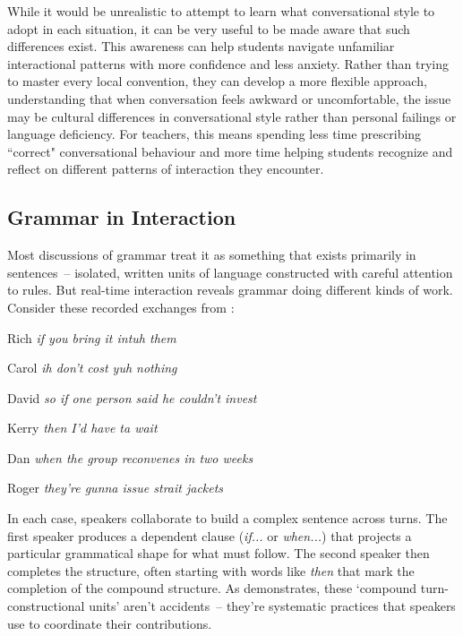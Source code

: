 While it would be unrealistic to attempt to learn what conversational style to adopt in each situation, it can be very useful to be made aware that such differences exist. This awareness can help students navigate unfamiliar interactional patterns with more confidence and less anxiety. Rather than trying to master every local convention, they can develop a more flexible approach, understanding that when conversation feels awkward or uncomfortable, the issue may be cultural differences in conversational style rather than personal failings or language deficiency. For teachers, this means spending less time prescribing ``correct" conversational behaviour and more time helping students recognize and reflect on different patterns of interaction they encounter.

\subsection{Grammar in Interaction} \label{subsec:grammar-interaction}

Most discussions of grammar treat it as something that exists primarily in sentences~-- isolated, written units of language constructed with careful attention to rules. But real-time interaction reveals grammar doing different kinds of work. Consider these recorded exchanges from \citet{lerner1991}:

\ea
   \ea
   \begin{dialogue}
       \item[Rich] \textit{if you bring it intuh them}
       \item[Carol] \textit{ih don't cost yuh nothing}
   \end{dialogue}
   \ex
   \begin{dialogue}
       \item[David] \textit{so if one person said he couldn't invest}
       \item[Kerry] \textit{then I'd have ta wait}
   \end{dialogue}
   \ex
   \begin{dialogue}
       \item[Dan] \textit{when the group reconvenes in two weeks}
       \item[Roger] \textit{they're gunna issue strait jackets}
   \end{dialogue}
   \z
\z

In each case, speakers collaborate to build a complex sentence across turns. The first speaker produces a dependent clause (\textit{if...} or \textit{when...}) that projects a particular grammatical shape for what must follow. The second speaker then completes the structure, often starting with words like \textit{then} that mark the completion of the compound structure. As \citet{lerner1991} demonstrates, these `compound turn-constructional units' aren't accidents~-- they're systematic practices that speakers use to coordinate their contributions.

